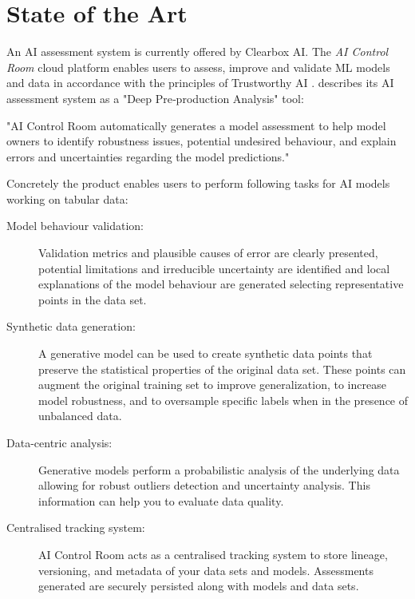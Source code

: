 \documentclass[11pt,a4paper,english]{scrreprt}
\begin{document}
\section{State of the Art}\label{section:state_of_the_art}
An AI assessment system is currently offered by Clearbox AI. The \textit{AI Control Room} cloud platform enables users to assess, improve and validate ML models and data in accordance with the principles of Trustworthy AI \parencite{clearbox_website,eu_trustworthy_ai}. \textcite{clearbox_website} describes its AI assessment system as a "Deep Pre‑production Analysis" tool:
\begin{displayquote}
    "AI Control Room automatically generates a model assessment to help model owners to identify robustness issues, potential undesired behaviour, and explain errors and uncertainties regarding the model predictions."
\end{displayquote}

Concretely the product enables users to perform following tasks for AI models working on tabular data:
\begin{description}
    \item [Model behaviour validation:] Validation metrics and plausible causes of error are clearly presented, potential limitations and irreducible uncertainty are identified and local explanations of the model behaviour are generated selecting representative points in the data set.
    \item [Synthetic data generation:] A generative model can be used to create synthetic data points that preserve the statistical properties of the original data set. These points can augment the original training set to improve generalization, to increase model robustness, and to oversample specific labels when in the presence of unbalanced data.
    \item [Data-centric analysis:] Generative models perform a probabilistic analysis of the underlying data allowing for robust outliers detection and uncertainty analysis. This information can help you to evaluate data quality.
    \item [Centralised tracking system:] AI Control Room acts as a centralised tracking system to store lineage, versioning, and metadata of your data sets and models. Assessments generated are securely persisted along with models and data sets.
\end{description}
\end{document}
